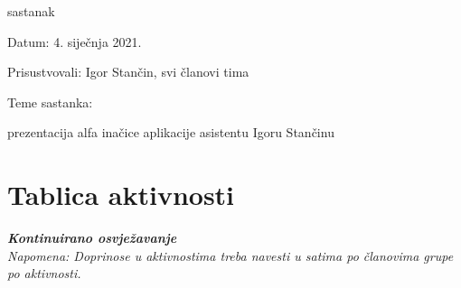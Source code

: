 \begin{packed_enum}
			\item  sastanak
			\item[] \begin{packed_item}
				\item Datum: 4. siječnja 2021. 
				\item Prisustvovali: Igor Stančin, svi članovi tima
				\item Teme sastanka:
				\begin{packed_item}
					\item prezentacija alfa inačice aplikacije asistentu Igoru Stančinu
				\end{packed_item}
			\end{packed_item}
		\end{packed_enum}
		
		\eject
		\section*{Tablica aktivnosti}
		
			\textbf{\textit{Kontinuirano osvježavanje}}\\
			
			 \textit{Napomena: Doprinose u aktivnostima treba navesti u satima po članovima grupe po aktivnosti.}
					
						
			
